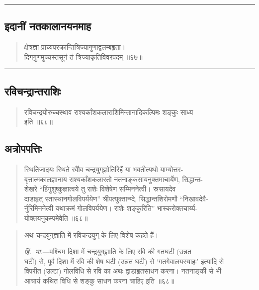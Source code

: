\documentclass[11pt,a4paper]{article}
\newcommand{\longline}{\noindent\rule{\textwidth}{0.4pt}}
\newcommand{\dev}[1]{{\devanagarifont #1}}
\newenvironment{shloka}{%
  \begin{quote}
  \small
  \setlength{\leftmargin}{2em}
  \devanagarifont
}{\end{quote}}
\newenvironment{vyakhya}{%
  \begin{quote}
  \small
  \setlength{\leftmargin}{1em}
  \devanagarifont
}{\end{quote}}
\newcommand{\skt}[1]{{\devanagarifont #1}}
\begin{document}
\longline

\subsection{\dev{इदानीं नतकालानयनमाह}}

\begin{shloka}
\skt{क्षेत्रज्ञा प्राच्यपरक्रान्तित्रिज्यागुणाद्वलम्बहृता।}\\
\skt{दिग्‌गुणमुच्चस्तसूनं तं त्रिज्याकृतिविवरपदम् ॥६७॥}
\end{shloka}

\longline

\subsection{\dev{रविचन्द्रान्तराशिः}}

\begin{shloka}
\skt{रविचन्द्रयोरुच्चस्थाव राश्यर्कांशकलाराशिमिन्तानादिकल्पिमः शङ्कुः साध्य}\\
\skt{इति ॥६८॥}
\end{shloka}

\subsection{\dev{अत्रोपपत्तिः}}

\begin{vyakhya}
\skt{स्थितिजादयः स्थिते रवौैव चन्द्रयुग्‌ज्ञोतिरिहैं या भवतीत्यथो याम्योत्तर-}\\
\skt{बृत्तात्मकालज्ञानाय राश्यर्कांशकलारतो नतनाङ्कसायनुक्तमाचार्येण, सिद्धान्त-}\\
\skt{शेखरे ``हिंगुशुष्कुज्ञात्वये तु राशेः विशेषेण सम्मिननेत्वी। स्रसायदेव}\\
\skt{दाडाहृत्‌ स्तास्थानगोलविपर्ययेण'' श्रीपत्युक्तान्म्दे, सिद्धान्तशिरोमणौ ``निखावदेवै-}\\
\skt{र्नुरिमिननेत्वी यथाक्रमं गोलविपर्ययेण। राशेः शङ्कुरिति'' भास्करोक्तचार्य्य-}\\
\skt{योक्तयनुकम्पमेवेति ॥६८॥}
\end{vyakhya}

\begin{vyakhya}
\skt{अथ चन्द्रयुग्‌ज्ञाति में रविचन्द्रयुग्‌ के लिए विशेष कहते हैं।}

\textit{हिं.\ भा.}—\skt{पश्चिम दिशा में चन्द्रयुग्‌ज्ञाति के लिए रवि की गतघटी (उन्नत}\\
\skt{घटी) से, पूर्व दिशा में रवि की शेष घटी (उन्नत घटी) से ‘गतगेवालयस्याहः’ इत्यादि से}\\
\skt{विपरीत (उल्टा) गोलविधि से रवि का अथः द्वाडाहृतसाधन करना। नतनाङ्की से भी}\\
\skt{आचार्य कथित विधि से शङ्कु साधन करना चाहिए इति ॥६८॥}
\end{vyakhya}
\end{document}

